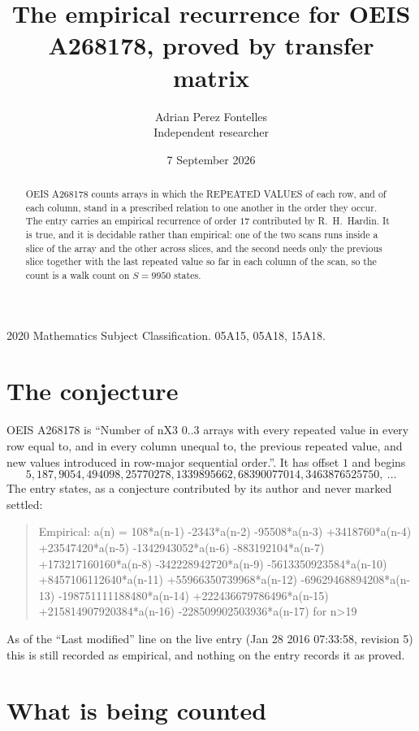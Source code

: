 \documentclass[11pt,a4paper]{article}
\title{The empirical recurrence for OEIS A268178, proved by transfer matrix}
\author{Adrian Perez Fontelles\\ \small Independent researcher}
\date{7 September 2026}
\theoremstyle{plain}
\theoremstyle{definition}
\begin{document}
\maketitle

\begin{abstract}
OEIS A268178 counts arrays in which the REPEATED VALUES of each row, and of each column, stand in a
prescribed relation to one another in the order they occur. The entry carries an empirical
recurrence of order $17$ contributed by R.~H.~Hardin. It is true, and it is decidable
rather than empirical: one of the two scans runs inside a slice of the array and the other
across slices, and the second needs only the previous slice together with the last repeated
value so far in each column of the scan, so the count is a walk count on $S=9950$ states.
\end{abstract}

\noindent\small 2020 Mathematics Subject Classification. 05A15, 05A18, 15A18.\normalsize

\section{The conjecture}

OEIS A268178 is ``Number of nX3 0..3 arrays with every repeated value in every row equal to, and in every column unequal to, the previous repeated value, and new values introduced in row-major sequential order.''. It has offset $1$ and begins
\[
5, 187, 9054, 494098, 25770278, 1339895662, 68390077014, 3463876525750,\ \dots
\]
The entry states, as a conjecture contributed by its author and never marked settled:
\begin{quote}
Empirical: a(n) = 108*a(n-1) -2343*a(n-2) -95508*a(n-3) +3418760*a(n-4) +23547420*a(n-5) -1342943052*a(n-6) -883192104*a(n-7) +173217160160*a(n-8) -342228942720*a(n-9) -5613350923584*a(n-10) +8457106112640*a(n-11) +55966350739968*a(n-12) -69629468894208*a(n-13) -198751111188480*a(n-14) +222436679786496*a(n-15) +215814907920384*a(n-16) -228509902503936*a(n-17) for n>19
\end{quote}
As of the ``Last modified'' line on the live entry (Jan 28 2016 07:33:58, revision 5) this is still
recorded as empirical, and nothing on the entry records it as proved.

\section{What is being counted}
\end{document}
